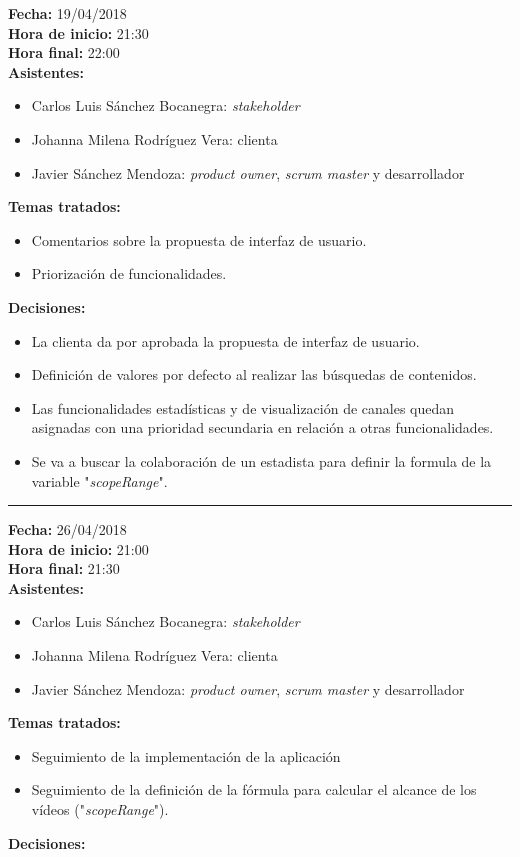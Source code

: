 \documentclass[11pt,a4paper]{article}
\begin{document}
\noindent\textbf{Fecha:} 19/04/2018
\\
\noindent\textbf{Hora de inicio:} 21:30
\\
\noindent\textbf{Hora final:} 22:00
\\
\noindent\textbf{Asistentes:} 
\begin{itemize}
\item Carlos Luis Sánchez Bocanegra: \textit{stakeholder}
\item Johanna Milena Rodríguez Vera: clienta
\item Javier Sánchez Mendoza: \textit{product owner}, \textit{scrum master} y desarrollador
\end{itemize}
\noindent\textbf{Temas tratados:}
\begin{itemize}
\item Comentarios sobre la propuesta de interfaz de usuario. 
\item Priorización de funcionalidades.
\end{itemize}
\noindent\textbf{Decisiones:}
\begin{itemize}
\item La clienta da por aprobada la propuesta de interfaz de usuario.
\item Definición de valores por defecto al realizar las búsquedas de contenidos.
\item Las funcionalidades estadísticas y de visualización de canales quedan asignadas con una prioridad secundaria en relación a otras funcionalidades.
\item Se va a buscar la colaboración de un estadista para definir la formula de la variable "\textit{scopeRange}".
\end{itemize}

\begin{center}\rule{10cm}{0.4pt}\end{center}

\noindent\textbf{Fecha:} 26/04/2018
\\
\noindent\textbf{Hora de inicio:} 21:00
\\
\noindent\textbf{Hora final:} 21:30
\\
\noindent\textbf{Asistentes:} 
\begin{itemize}
\item Carlos Luis Sánchez Bocanegra: \textit{stakeholder}
\item Johanna Milena Rodríguez Vera: clienta
\item Javier Sánchez Mendoza: \textit{product owner}, \textit{scrum master} y desarrollador
\end{itemize}
\noindent\textbf{Temas tratados:}
\begin{itemize}
\item Seguimiento de la implementación de la aplicación
\item Seguimiento de la definición de la fórmula para calcular el alcance de los vídeos ("\textit{scopeRange}").
\end{itemize}
\noindent\textbf{Decisiones:}
\end{document}
